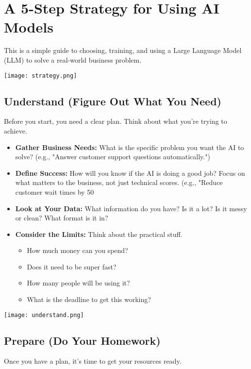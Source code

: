 \newpage
\section{A 5-Step Strategy for Using AI Models}
This is a simple guide to choosing, training, and using a Large Language Model (LLM) to solve a real-world business problem.
\begin{center}
\texttt{[image: strategy.png]}
\end{center}


\newpage
\subsection{Understand (Figure Out What You Need)}
Before you start, you need a clear plan. Think about what you're trying to achieve.

\begin{itemize}
    \item \textbf{Gather Business Needs:} What is the specific problem you want the AI to solve? (e.g., "Answer customer support questions automatically.")
    \item \textbf{Define Success:} How will you know if the AI is doing a good job? Focus on what matters to the business, not just technical scores. (e.g., "Reduce customer wait times by 50%
    \item \textbf{Look at Your Data:} What information do you have? Is it a lot? Is it messy or clean? What format is it in?
    \item \textbf{Consider the Limits:} Think about the practical stuff.
    \begin{itemize}
        \item How much money can you spend?
        \item Does it need to be super fast?
        \item How many people will be using it?
        \item What is the deadline to get this working?
    \end{itemize}
\end{itemize}

\begin{center}
\texttt{[image: understand.png]}
\end{center}

\newpage
\subsection{Prepare (Do Your Homework)}
Once you have a plan, it's time to get your resources ready.

